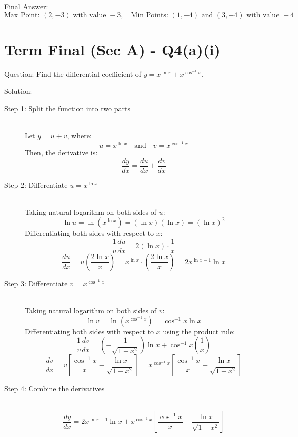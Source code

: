 \documentclass[11pt, a4paper]{article}
\begin{document}
Final Answer:
\[ 
\boxed{\text{Max Point: } (2, -3) \text{ with value } -3, \quad \text{Min Points: } (1, -4) \text{ and } (3, -4) \text{ with value } -4} 
\]



\section*{Term Final (Sec A) - Q4(a)(i)}

Question:
Find the differential coefficient of $y = x^{\ln x} + x^{\cos^{-1}x}$.

Solution:

\begin{description}
    \item[Step 1: Split the function into two parts] \ \\
    Let $y = u + v$, where:
    \[ u = x^{\ln x} \quad \text{and} \quad v = x^{\cos^{-1}x} \]
    Then, the derivative is:
    \[ \frac{dy}{dx} = \frac{du}{dx} + \frac{dv}{dx} \]

    \item[Step 2: Differentiate $u = x^{\ln x}$] \ \\
    Taking natural logarithm on both sides of $u$:
    \[ \ln u = \ln\left(x^{\ln x}\right) = (\ln x)(\ln x) = (\ln x)^2 \]
    Differentiating both sides with respect to $x$:
    \[ \frac{1}{u}\frac{du}{dx} = 2(\ln x) \cdot \frac{1}{x} \]
    \[ \frac{du}{dx} = u \left(\frac{2\ln x}{x}\right) = x^{\ln x} \cdot \left(\frac{2\ln x}{x}\right) = 2x^{\ln x - 1} \ln x \]

    \item[Step 3: Differentiate $v = x^{\cos^{-1}x}$] \ \\
    Taking natural logarithm on both sides of $v$:
    \[ \ln v = \ln\left(x^{\cos^{-1}x}\right) = \cos^{-1}x \ln x \]
    Differentiating both sides with respect to $x$ using the product rule:
    \[ \frac{1}{v}\frac{dv}{dx} = \left(-\frac{1}{\sqrt{1-x^2}}\right) \ln x + \cos^{-1}x \left(\frac{1}{x}\right) \]
    \[ \frac{dv}{dx} = v \left[ \frac{\cos^{-1}x}{x} - \frac{\ln x}{\sqrt{1-x^2}} \right] = x^{\cos^{-1}x} \left[ \frac{\cos^{-1}x}{x} - \frac{\ln x}{\sqrt{1-x^2}} \right] \]

    \item[Step 4: Combine the derivatives] \ \\
    \[ \frac{dy}{dx} = 2x^{\ln x - 1} \ln x + x^{\cos^{-1}x} \left[ \frac{\cos^{-1}x}{x} - \frac{\ln x}{\sqrt{1-x^2}} \right] \]
\end{description}
\end{document}
